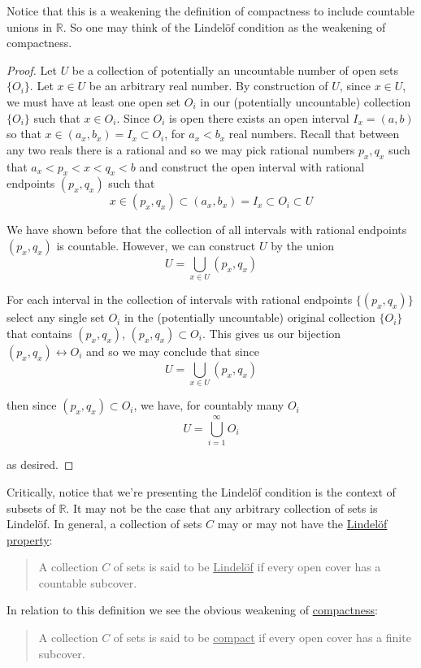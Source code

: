 \documentclass[12pt]{article}
\newlength\tindent
\renewcommand{\indent}{\hspace*{\tindent}}
\newcommand{\R}{\mathbb R}
\begin{document}
\indent Notice that this is a weakening the definition of compactness to include countable unions in $\R$. So one may think of the Lindel\"{o}f condition as the weakening of compactness.

\begin{proof} Let $U$ be a collection of potentially an uncountable number of open sets $\{O_i\}$. Let $x \in U$ be an arbitrary real number. By construction of $U$, since $x \in U$, we must have at least one open set $O_i$ in our (potentially uncountable) collection $\{O_i\}$ such that $x \in O_i$. Since $O_i$ is open there exists an open interval $I_x = (a, b)$ so that $x \in (a_x,b_x) = I_x \subset O_i$, for $a_x < b_x$ real numbers. Recall that between any two reals there is a rational and so we may pick rational numbers $p_x, q_x$ such that $a_x < p_x < x < q_x < b$ and construct the open interval with rational endpoints $(p_x, q_x)$ such that
\begin{equation*}
	x \in (p_x, q_x) \subset (a_x, b_x) = I_x \subset O_i \subset U
\end{equation*}

\indent We have shown before that the collection of all intervals with rational endpoints $(p_x, q_x)$ is countable. However, we can construct $U$ by the union 
\begin{equation*}
	U = \bigcup_{x \in U} (p_x, q_x)
\end{equation*}

\indent For each interval in the collection of intervals with rational endpoints $\{(p_x, q_x)\}$ select any single set $O_i$ in the (potentially uncountable) original collection $\{O_i\}$ that contains $(p_x, q_x)$, $(p_x, q_x) \subset O_i$. This gives us our bijection $(p_x, q_x) \leftrightarrow O_i$ and so we may conclude that since
\begin{equation*}
	U = \bigcup_{x \in U} (p_x, q_x)
\end{equation*}

then since $(p_x, q_x) \subset O_i$, we have, for countably many $O_i$
\begin{equation*}
	U = \bigcup^\infty_{i = 1} O_i
\end{equation*}

as desired.
\end{proof}

\indent Critically, notice that we're presenting the Lindel\"{o}f condition is the context of subsets of $\R$. It may not be the case that any arbitrary collection of sets is Lindel\"{o}f. In general, a collection of sets $C$ may or may not have the \underline{Lindel\"{o}f property}:

\begin{quote} A collection $C$ of sets is said to be \underline{Lindel\"{o}f} if every open cover has a countable subcover.
\end{quote}

In relation to this definition we see the obvious weakening of \underline{compactness}:
\begin{quote}
	A collection $C$ of sets is said to be \underline{compact} if every open cover has a finite subcover.
\end{quote}
\end{document}
